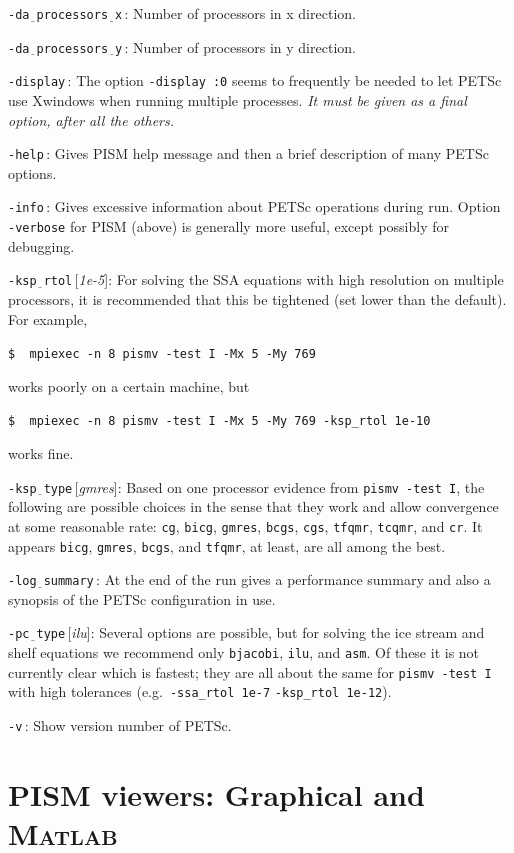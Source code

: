 \documentclass[11pt,final]{amsart}
\renewcommand{\t}[1]{\texttt{#1}}
\newcommand{\Matlab}{\textsc{Matlab}\xspace}
\newcommand{\rawopt}[1]{\vspace{1mm}\noindent \large\texttt{-#1}\normalsize}
\newcommand{\opt}[1]{\rawopt{#1}\,:\quad}
\newcommand{\optdef}[2]{\rawopt{#1}\,[\textsl{#2}]:\quad}
\newcommand{\und}{$\underline{\,\,\,}$}
\begin{document}
\opt{da\und processors\und x}  Number of processors in x direction.

\opt{da\und processors\und y}  Number of processors in y direction.

\opt{display}  The option \verb|-display :0| seems to frequently be needed to let PETSc use Xwindows when running multiple processes.  \emph{It must be given as a \emph{final} option, after all the others.}

\opt{help}  Gives PISM help message and then a brief description of many PETSc options.

\opt{info}  Gives excessive information about PETSc operations during run.  Option \verb|-verbose| for PISM (above) is generally more useful, except possibly for debugging.

\optdef{ksp\und rtol}{1e-5}  For solving the SSA equations with high resolution on multiple processors, it is recommended that this be tightened (set lower than the default).  For example, 

\verb|$  mpiexec -n 8 pismv -test I -Mx 5 -My 769|

\noindent works poorly on a certain machine, but

\verb|$  mpiexec -n 8 pismv -test I -Mx 5 -My 769 -ksp_rtol 1e-10|

\noindent works fine.

\optdef{ksp\und type}{gmres}  Based on one processor evidence from \verb|pismv -test I|, the following are possible choices in the sense that they work and allow convergence at some reasonable rate: \t{cg}, \t{bicg}, \t{gmres}, \t{bcgs}, \t{cgs}, \t{tfqmr}, \t{tcqmr}, and \t{cr}.  It appears \t{bicg}, \t{gmres}, \t{bcgs}, and \t{tfqmr}, at least, are all among the best.

\opt{log\und summary}  At the end of the run gives a performance summary and also a synopsis of the PETSc configuration in use.

\optdef{pc\und type}{ilu}   Several options are possible, but for solving the ice stream and shelf equations we recommend only \t{bjacobi}, \t{ilu}, and \t{asm}.  Of these it is not currently clear which is fastest; they are all about the same for \verb|pismv -test I| with high tolerances (e.g.~\verb|-ssa_rtol 1e-7| \verb|-ksp_rtol 1e-12|).

\opt{v}   Show version number of PETSc.


\clearpage \newpage
\section{PISM viewers: Graphical and \Matlab}\label{sect:viewers}
\end{document}
